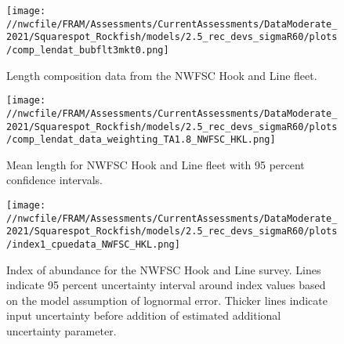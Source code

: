 \documentclass[11pt,
  english,
  a4paper,
]{article}
\begin{document}
\tagmcend\tagstructend


\begin{figure}
\centering
\texttt{[image: //nwcfile/FRAM/Assessments/CurrentAssessments/DataModerate\_2021/Squarespot\_Rockfish/models/2.5\_rec\_devs\_sigmaR60/plots/comp\_lendat\_bubflt3mkt0.png]}
\caption{Length composition data from the NWFSC Hook and Line fleet.\label{fig:hkl-len-data}}
\end{figure}

\tagmcend\tagstructend


\begin{figure}
\centering
\texttt{[image: //nwcfile/FRAM/Assessments/CurrentAssessments/DataModerate\_2021/Squarespot\_Rockfish/models/2.5\_rec\_devs\_sigmaR60/plots/comp\_lendat\_data\_weighting\_TA1.8\_NWFSC\_HKL.png]}
\caption{Mean length for NWFSC Hook and Line fleet with 95 percent confidence intervals.\label{fig:mean-hkl-len-data}}
\end{figure}

\tagmcend\tagstructend


\begin{figure}
\centering
\texttt{[image: //nwcfile/FRAM/Assessments/CurrentAssessments/DataModerate\_2021/Squarespot\_Rockfish/models/2.5\_rec\_devs\_sigmaR60/plots/index1\_cpuedata\_NWFSC\_HKL.png]}
\caption{Index of abundance for the NWFSC Hook and Line survey. Lines indicate 95 percent uncertainty interval around index values based on the model assumption of lognormal error. Thicker lines indicate input uncertainty before addition of estimated additional uncertainty parameter.\label{fig:hkl-index}}
\end{figure}

\tagmcend\tagstructend
\end{document}

